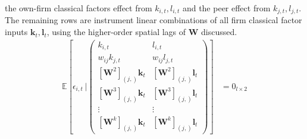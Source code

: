 the own-firm classical factors effect from $k_{i,t},l_{i,t}$
and the  peer effect from $k_{j,t},l_{j,t}$.
The remaining rows are instrument linear combinations of all
firm classical factor inputs $\mathbf k_t, \mathbf l_t$,
using the higher-order spatial lags of $\mathbf W$ discussed.
\begin{align}
    \label{eq:static-moment-conditions}
    \mathbb E[
        \epsilon_{i,t}\ 
        \vert
        \begin{pmatrix}
            k_{i,t}                                     & l_{i,t} \\
            w_{ij}k_{j,t}                               & w_{ij}l_{j,t}   \\
            \left[\mathbf W^2\right]_{(j,)} \mathbf k_t & \left[\mathbf W^2\right]_{(j,)} \mathbf l_t\\
            \left[\mathbf W^3\right]_{(j,)} \mathbf k_t & \left[\mathbf W^3\right]_{(j,)} \mathbf l_t\\
            \vdots & \vdots \\
            \left[\mathbf W^k\right]_{(j,)} \mathbf k_t & \left[\mathbf W^k\right]_{(j,)} \mathbf l_t
        \end{pmatrix}
    ]
    &= 0_{l\times 2}
\end{align}

